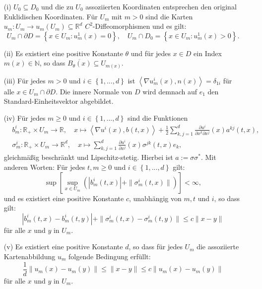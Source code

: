 \documentclass[10pt, a4paper, leqno, twoside, bibliography=totocnumbered, final]{scrartcl}
\theoremstyle{definition}
\theoremstyle{plain}%
\theoremstyle{remark}
\begin{document}
\begin{enumerate}
\item[(i)] $ U_0 \subseteq D_0 $ und die zu $ U_0 $ assoziierten Koordinaten entsprechen den original Euklidischen Koordinaten. Für $ U_m $ mit $ m > 0 $ sind die Karten $ u_m : U_m \to u_m(U_m) \subseteq \mathbb{R}^d $ $C^2$-Diffeomorphismen und es gilt:
\begin{equation*}
U_m \cap \partial D = \left\lbrace x \in U_m : u_m^1(x) = 0 \right\rbrace, \quad U_m \cap D_0 = \left\lbrace x \in U_m : u_m^1(x) > 0 \right\rbrace.
\end{equation*}
\item[(ii)] Es existiert eine positive Konstante $ \theta $ und für jedes $ x \in D $ ein Index $ m(x) \in \mathbb{N} $, so dass $ \overline{ B_{\theta}(x) } \subseteq U_{m(x)}  $.
\item[(iii)] Für jedes $ m > 0 $ und $ i \in \left\lbrace 1, ... , d \right\rbrace $ ist $\left\langle \nabla u_m^i(x) , n(x)\right\rangle = \delta_{1i} $ für alle $ x \in U_m \cap \partial D $. Die innere Normale von $ D $ wird demnach auf $e_1$ den Standard-Einheitsvektor abgebildet.
\item[(iv)] Für jedes $ m \geq 0 $ und $ i \in \left\lbrace 1, ... , d \right\rbrace $ sind die Funktionen
\begin{align}\label{eq:lokalisation-b}
& b_m^i : \mathbb{R}_+ \times U_m \to \mathbb{R},\quad  x \mapsto \left\langle \nabla u^i(x) , b(t,x) \right\rangle + \frac{1}{2} \sum_{k,j = 1}^d \frac{\partial u^i}{\partial x^k \partial x^j}(x) a^{kj}(t,x),\\
& \sigma_m^i : \mathbb{R}_+ \times U_m \to \mathbb{R}^d, \quad  x \mapsto \sum_{k,j = 1}^d \frac{\partial u^i}{\partial x^j}(x) \sigma^{jk}(t,x) e_k, \label{eq:lokalisation-sigma}
\end{align}
gleichmäßig beschränkt und Lipschitz-stetig. Hierbei ist $ a := \sigma \sigma^* $. Mit anderen Worten: Für jedes $ t,m \geq 0$ und $ i \in \left\lbrace 1, ... , d \right\rbrace $ gilt:
\begin{equation}
\sup \left[ \sup_{x \in U_m} \left( |b^i_m(t,x) | + \| \sigma_m^i(t,x) \| \right) \right] < \infty,
\end{equation}
und es existiert eine positive Konstante $c$, unabhängig von $m,t$ und $i$, so dass gilt:
\begin{equation}
| b_m^i(t,x) - b_m^i(t,y) | + \| \sigma_m^i(t,x) - \sigma_m^i(t,y) \| \leq c \| x - y \|
\end{equation}
für alle $x$ und $y$ in $U_m$.
\item[(v)] Es existiert eine positive Konstante $ d $, so dass für jedes $ U_m $ die assoziierte Kartenabbildung $ u_m $ folgende Bedingung erfüllt:
\begin{equation*}
\frac{1}{d} \| u_m(x) - u_m(y) \| \leq \| x - y \| \leq c \| u_m(x) - u_m(y) \|
\end{equation*}
für alle $x$ und $y$ in $U_m$.
\end{enumerate}
\end{document}

